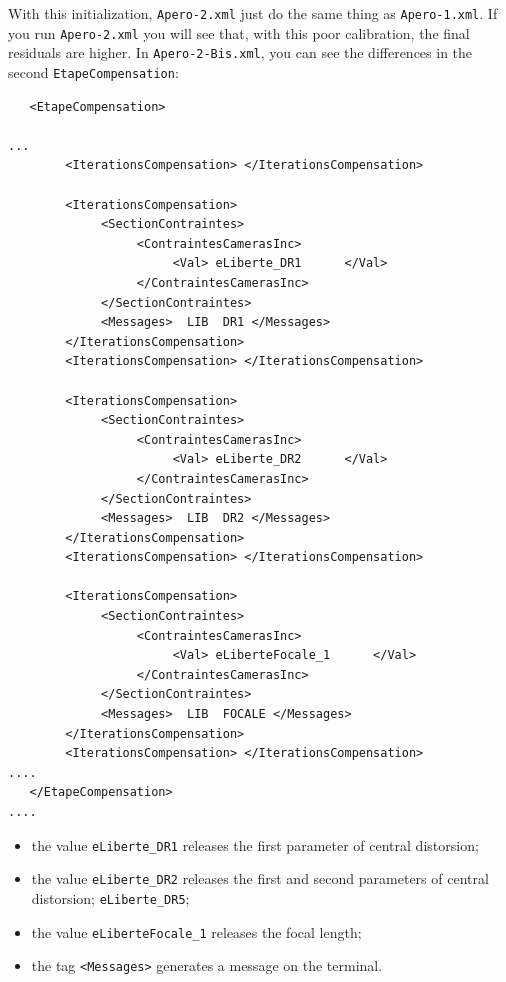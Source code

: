 With this initialization,  {\tt Apero-2.xml} just do the same thing as {\tt Apero-1.xml}.
If you run {\tt Apero-2.xml} you will see that, with this poor calibration, the final residuals are higher.
In  {\tt Apero-2-Bis.xml}, you can see the differences in the second  {\tt EtapeCompensation}:

{\scriptsize
\begin{verbatim}
   <EtapeCompensation>

...
        <IterationsCompensation> </IterationsCompensation>

        <IterationsCompensation>
             <SectionContraintes>
                  <ContraintesCamerasInc>
                       <Val> eLiberte_DR1      </Val>
                  </ContraintesCamerasInc>
             </SectionContraintes>
             <Messages>  LIB  DR1 </Messages>
        </IterationsCompensation>
        <IterationsCompensation> </IterationsCompensation>

        <IterationsCompensation>
             <SectionContraintes>
                  <ContraintesCamerasInc>
                       <Val> eLiberte_DR2      </Val>
                  </ContraintesCamerasInc>
             </SectionContraintes>
             <Messages>  LIB  DR2 </Messages>
        </IterationsCompensation>
        <IterationsCompensation> </IterationsCompensation>

        <IterationsCompensation>
             <SectionContraintes>
                  <ContraintesCamerasInc>
                       <Val> eLiberteFocale_1      </Val>
                  </ContraintesCamerasInc>
             </SectionContraintes>
             <Messages>  LIB  FOCALE </Messages>
        </IterationsCompensation>
        <IterationsCompensation> </IterationsCompensation>
....        
   </EtapeCompensation>
....        

\end{verbatim}
}



\begin{itemize}
   \item the value {\tt eLiberte\_DR1} releases the first  parameter of central distorsion;

   \item the value {\tt eLiberte\_DR2} releases the first and second parameters of central distorsion;
          {\tt eLiberte\_DR5};

   \item the value {\tt eLiberteFocale\_1} releases the focal length;
   \item the tag  {\tt <Messages>} generates a message on the terminal.

\end{itemize}

